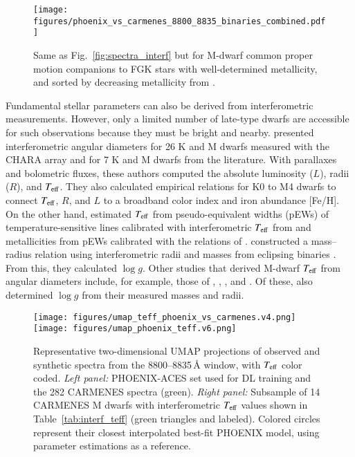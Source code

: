 \documentclass{aa}
\begin{document}
\begin{figure}
    \centering
    \texttt{[image: figures/phoenix\_vs\_carmenes\_8800\_8835\_binaries\_combined.pdf]}
    \caption{Same as Fig.~\ref{fig:spectra_interf} but for M-dwarf common proper motion companions to FGK stars with well-determined metallicity, and sorted by decreasing metallicity from \cite{Schweitzer2019}.
    }
    \label{fig:spectra_binaries}
\end{figure}

Fundamental stellar parameters can also be derived from interferometric measurements. 
However, only a limited number of late-type dwarfs are accessible for such observations because they must be bright and nearby.
\cite{Boyajian2012} presented interferometric angular diameters for 26 K and M dwarfs measured with the CHARA array and for 7 K and M dwarfs from the literature. 
With parallaxes and bolometric fluxes, these authors computed the absolute luminosity ($L$), radii ($R$), and $T_{\rm eff}$. 
They also calculated empirical relations for K0 to M4 dwarfs to connect $T_{\rm eff}$, $R$, and $L$ to a broadband color index and iron abundance [Fe/H].
On the other hand, \cite{Maldonado2015} estimated $T_{\rm eff}$ from pseudo-equivalent widths (pEWs) of temperature-sensitive lines calibrated with interferometric $T_{\rm eff}$ from \cite{Boyajian2012} and metallicities from pEWs calibrated with the relations of \citet{Neves2012}.
 \cite{Maldonado2015} constructed a mass--radius relation using interferometric radii \citep{Boyajian2012,vonBraun2014} and masses from eclipsing binaries \citep{Hartman2015}. 
From this, they calculated $\log{g}$. 
Other {studies} that derived M-dwarf $T_{\rm eff}$ from angular diameters include, for example, those of \cite{Segransan2003}, \cite{Demory2009}, \cite{vonBraun2014}, and \cite{Newton2015}. 
Of these, \cite{Segransan2003} also determined $\log{g}$ from their measured masses and radii. 

\begin{figure*}
  \centering
  \texttt{[image: figures/umap\_teff\_phoenix\_vs\_carmenes.v4.png]}
  \hspace{0.5cm}
  \texttt{[image: figures/umap\_phoenix\_teff.v6.png]}  
  \caption{Representative two-dimensional UMAP projections of observed and synthetic spectra {from the 8800--8835\,\AA{} window, with $T_{\rm eff}$ color coded.}
  {\it Left panel:} PHOENIX-ACES set used for DL training  and  the 282 CARMENES spectra (green).
  {\it Right panel:} Subsample of 14 CARMENES M dwarfs with interferometric $T_{\rm eff}$ values shown in Table~\ref{tab:interf_teff} (green triangles and labeled). Colored circles represent their closest interpolated best-fit PHOENIX model, using \cite{Schweitzer2019} parameter estimations as a reference.}
  \label{fig:umap_teff_phx_carmenes}
\end{figure*}
\end{document}
